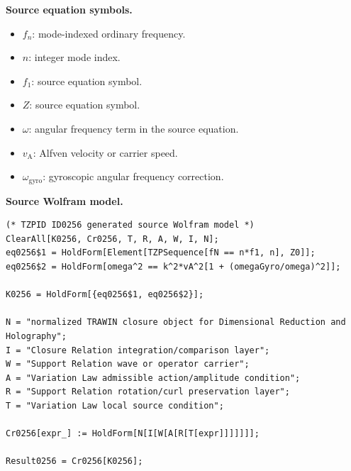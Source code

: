 \begin{minipage}[t]{0.49\linewidth}
\begingroup
\small
\raggedright
\textbf{Source equation symbols.}\par
\begin{itemize}[leftmargin=1.35em,itemsep=1pt,topsep=1pt,parsep=0pt]
    \item $f_{n}$: mode-indexed ordinary frequency.
    \item $n$: integer mode index.
    \item $f_{1}$: source equation symbol.
    \item $Z$: source equation symbol.
    \item $\omega$: angular frequency term in the source equation.
    \item $v_{\mathrm{A}}$: Alfven velocity or carrier speed.
    \item $\omega_{\mathrm{gyro}}$: gyroscopic angular frequency correction.
\end{itemize}
\endgroup
\end{minipage}\hfill
\begin{minipage}[t]{0.47\linewidth}
\begingroup
\scriptsize
\raggedright
\textbf{Source Wolfram model.}\par
\begin{Verbatim}[fontsize=\tiny,breaklines=true,breakanywhere=true]
(* TZPID ID0256 generated source Wolfram model *)
ClearAll[K0256, Cr0256, T, R, A, W, I, N];
eq0256$1 = HoldForm[Element[TZPSequence[fN == n*f1, n], Z0]];
eq0256$2 = HoldForm[omega^2 == k^2*vA^2[1 + (omegaGyro/omega)^2]];

K0256 = HoldForm[{eq0256$1, eq0256$2}];

N = "normalized TRAWIN closure object for Dimensional Reduction and Holography";
I = "Closure Relation integration/comparison layer";
W = "Support Relation wave or operator carrier";
A = "Variation Law admissible action/amplitude condition";
R = "Support Relation rotation/curl preservation layer";
T = "Variation Law local source condition";

Cr0256[expr_] := HoldForm[N[I[W[A[R[T[expr]]]]]]];

Result0256 = Cr0256[K0256];
\end{Verbatim}
\endgroup
\end{minipage}

